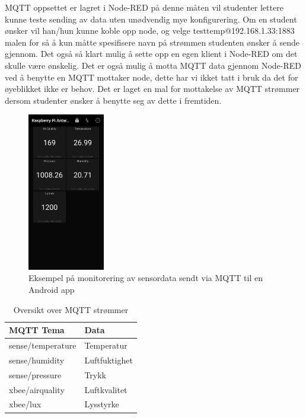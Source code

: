 \documentclass{article}
\begin{document}
MQTT oppsettet er lagret i Node-RED på denne måten vil studenter lettere kunne teste sending av data uten unødvendig mye konfigurering. Om en student ønsker vil han/hun kunne koble opp node, og velge testtemp@192.168.1.33:1883 malen for så å kun måtte spesifisere navn på strømmen studenten ønsker å sende gjennom. Det også så klart mulig å sette opp en egen klient i Node-RED om det skulle være ønskelig. Det er også mulig å motta MQTT data gjennom Node-RED ved å benytte en MQTT mottaker node, dette har vi ikket tatt i bruk da det for øyeblikket ikke er behov. Det er laget en mal for mottakelse av MQTT strømmer dersom studenter ønsker å benytte seg av dette i fremtiden.

\begin{figure}[!ht]
  \centering
      \includegraphics[width=0.3\textwidth]{mqttmobil}
  \caption{Eksempel på monitorering av sensordata sendt via MQTT til en Android app}
\end{figure}


\begin{table}[]
	\centering
	\caption{Oversikt over MQTT strømmer}
	\label{MQTT}
	\begin{tabular}{|l|l|}
		\hline
		\textbf{ MQTT Tema }			&  \textbf{Data} \\ \hline
	 	sense/temperature 				&  Temperatur \\ \hline
	 	sense/humidity 					&  Luftfuktighet \\ \hline
 	 	sense/pressure 					&  Trykk \\ \hline
 	 	xbee/airquality 					&  Luftkvalitet \\ \hline
 	 	xbee/lux 								&  Lysstyrke\\ \hline
	\end{tabular}
\end{table}
\end{document}
